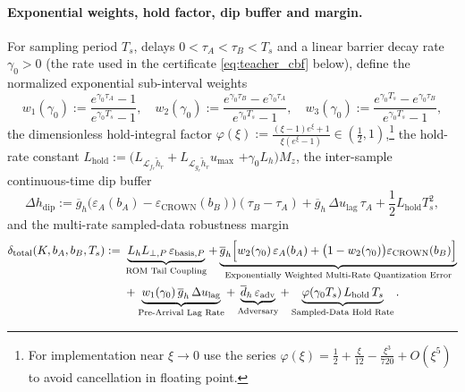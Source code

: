 \paragraph{Exponential weights, hold factor, dip buffer and margin.}
For sampling period \(T_s\), delays \(0 < \tau_A < \tau_B < T_s\) and a linear barrier decay rate \(\gamma_0 > 0\) (the rate used in the certificate \eqref{eq:teacher_cbf} below), define the normalized exponential sub-interval weights
\begin{equation}
\label{eq:exp_weights}
w_1(\gamma_0) := \frac{e^{\gamma_0 \tau_A} - 1}{e^{\gamma_0 T_s} - 1}, \quad w_2(\gamma_0) := \frac{e^{\gamma_0 \tau_B} - e^{\gamma_0 \tau_A}}{e^{\gamma_0 T_s} - 1}, \quad w_3(\gamma_0) := \frac{e^{\gamma_0 T_s} - e^{\gamma_0 \tau_B}}{e^{\gamma_0 T_s} - 1},
\end{equation}
the dimensionless hold-integral factor \(\varphi(\xi) := \frac{(\xi - 1)e^\xi + 1}{\xi(e^\xi - 1)} \in (\frac{1}{2}, 1)\),\footnote{For implementation near \(\xi \to 0\) use the series \(\varphi(\xi) = \tfrac12 + \tfrac{\xi}{12} - \tfrac{\xi^3}{720} + O(\xi^5)\) to avoid cancellation in floating point.} the hold-rate constant \(L_{\mathrm{hold}} := (L_{\mathcal{L}_{f_r}\tilde{h}_r} + L_{\mathcal{L}_{g_r}\tilde{h}_r} u_{\max}\) \(+ \gamma_0 L_h) M_z\), the inter-sample continuous-time dip buffer
\begin{equation}
\label{eq:delta_dip}
\Delta h_{\mathrm{dip}} := \overline{g}_h \big(\varepsilon_A(b_A) - \varepsilon_{\mathrm{CROWN}}(b_B)\big)(\tau_B - \tau_A) + \overline{g}_h\,\Delta u_{\mathrm{lag}}\,\tau_A + \frac{1}{2}L_{\mathrm{hold}} T_s^2,
\end{equation}
and the multi-rate sampled-data robustness margin
\begin{equation}
\label{eq:delta_total_exact}
\begin{aligned}
\delta_{\mathrm{total}}(K, b_A, b_B, T_s) :={}& \underbrace{L_h L_{\perp,P}\,\varepsilon_{\mathrm{basis},P}}_{\text{ROM Tail Coupling}} + \underbrace{\overline{g}_h \Big[ w_2(\gamma_0)\,\varepsilon_A(b_A) + \big(1 - w_2(\gamma_0)\big)\varepsilon_{\mathrm{CROWN}}(b_B) \Big]}_{\text{Exponentially Weighted Multi-Rate Quantization Error}} \\
&+ \underbrace{w_1(\gamma_0)\,\overline{g}_h\,\Delta u_{\mathrm{lag}}}_{\text{Pre-Arrival Lag Rate}} + \underbrace{\overline{d}_h\,\varepsilon_{\mathrm{adv}}}_{\text{Adversary}} + \underbrace{\varphi(\gamma_0 T_s)\,L_{\mathrm{hold}}\,T_s}_{\text{Sampled-Data Hold Rate}}.
\end{aligned}
\end{equation}

